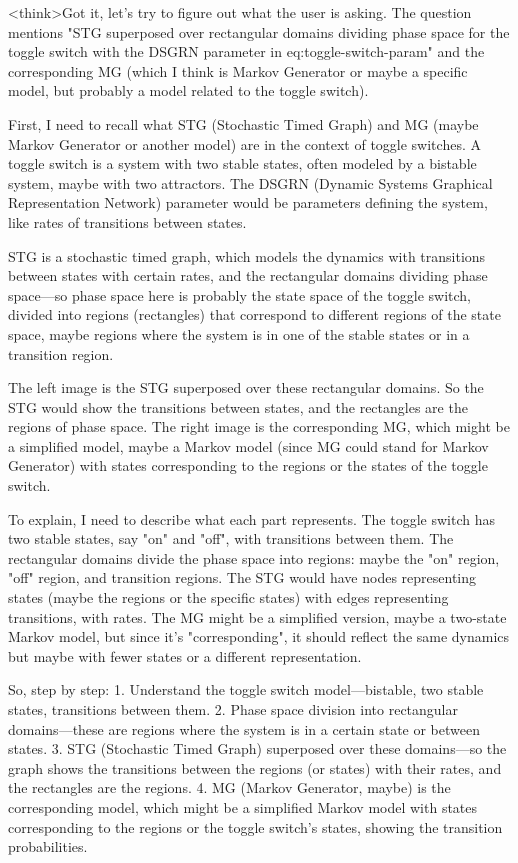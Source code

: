 <think>Got it, let's try to figure out what the user is asking. The question mentions "STG superposed over rectangular domains dividing phase space for the toggle switch with the DSGRN parameter in eq:toggle-switch-param" and the corresponding MG (which I think is Markov Generator or maybe a specific model, but probably a model related to the toggle switch). 

First, I need to recall what STG (Stochastic Timed Graph) and MG (maybe Markov Generator or another model) are in the context of toggle switches. A toggle switch is a system with two stable states, often modeled by a bistable system, maybe with two attractors. The DSGRN (Dynamic Systems Graphical Representation Network) parameter would be parameters defining the system, like rates of transitions between states.

STG is a stochastic timed graph, which models the dynamics with transitions between states with certain rates, and the rectangular domains dividing phase space—so phase space here is probably the state space of the toggle switch, divided into regions (rectangles) that correspond to different regions of the state space, maybe regions where the system is in one of the stable states or in a transition region.

The left image is the STG superposed over these rectangular domains. So the STG would show the transitions between states, and the rectangles are the regions of phase space. The right image is the corresponding MG, which might be a simplified model, maybe a Markov model (since MG could stand for Markov Generator) with states corresponding to the regions or the states of the toggle switch.

To explain, I need to describe what each part represents. The toggle switch has two stable states, say "on" and "off", with transitions between them. The rectangular domains divide the phase space into regions: maybe the "on" region, "off" region, and transition regions. The STG would have nodes representing states (maybe the regions or the specific states) with edges representing transitions, with rates. The MG might be a simplified version, maybe a two-state Markov model, but since it's "corresponding", it should reflect the same dynamics but maybe with fewer states or a different representation.

So, step by step: 1. Understand the toggle switch model—bistable, two stable states, transitions between them. 2. Phase space division into rectangular domains—these are regions where the system is in a certain state or between states. 3. STG (Stochastic Timed Graph) superposed over these domains—so the graph shows the transitions between the regions (or states) with their rates, and the rectangles are the regions. 4. MG (Markov Generator, maybe) is the corresponding model, which might be a simplified Markov model with states corresponding to the regions or the toggle switch's states, showing the transition probabilities.

